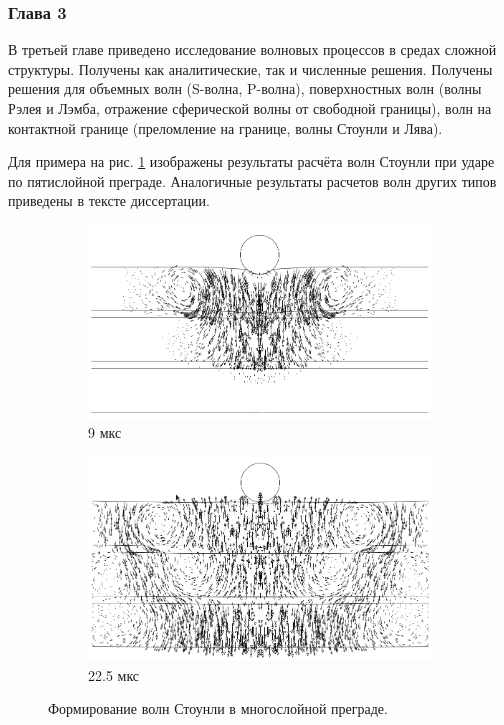 \clearpage
\newpage

\subsubsection*{Глава 3}

В третьей главе приведено исследование волновых процессов в средах сложной структуры. Получены как аналитические, так и численные решения. Получены решения для объемных волн (S-волна, P-волна), поверхностных волн (волны Рэлея и Лэмба, отражение сферической волны от свободной границы), волн на контактной границе (преломление на границе, волны Стоунли и Лява).

Для примера на рис. \ref{pic:stounly_wave} изображены результаты расчёта волн Стоунли при ударе по пятислойной преграде. Аналогичные результаты расчетов волн других типов приведены в тексте диссертации.

\begin{figure}[ht]
\centering
\begin{subfigure}[b]{0.45\textwidth}
\centering
\includegraphics[width=\textwidth]{png/stounly-wave/01.png}
\caption{9 мкс}
\end{subfigure}
\begin{subfigure}[b]{0.45\textwidth}
\centering
\includegraphics[width=\textwidth]{png/stounly-wave/03.png}
\caption{22.5 мкс}
\end{subfigure}
\caption{Формирование волн Стоунли в многослойной преграде.}
\label{pic:stounly_wave}
\end{figure}

